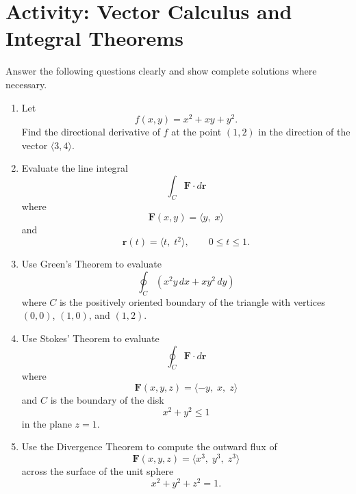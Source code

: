 \section*{Activity: Vector Calculus and Integral Theorems}

Answer the following questions clearly and show complete solutions where necessary.

\begin{enumerate}
    \item Let
    \[
    f(x,y)=x^2+xy+y^2.
    \]
    Find the directional derivative of $f$ at the point $(1,2)$ in the direction of the vector $\langle 3,4\rangle$.

    \item Evaluate the line integral
    \[
    \int_C \mathbf{F}\cdot d\mathbf{r}
    \]
    where
    \[
    \mathbf{F}(x,y)=\langle y,\; x\rangle
    \]
    and
    \[
    \mathbf{r}(t)=\langle t,\; t^2\rangle,\qquad 0\le t\le 1.
    \]

    \item Use Green's Theorem to evaluate
    \[
    \oint_C (x^2y\,dx+xy^2\,dy)
    \]
    where $C$ is the positively oriented boundary of the triangle with vertices $(0,0)$, $(1,0)$, and $(1,2)$.

    \item Use Stokes' Theorem to evaluate
    \[
    \oint_C \mathbf{F}\cdot d\mathbf{r}
    \]
    where
    \[
    \mathbf{F}(x,y,z)=\langle -y,\; x,\; z\rangle
    \]
    and $C$ is the boundary of the disk
    \[
    x^2+y^2\le 1
    \]
    in the plane $z=1$.

    \item Use the Divergence Theorem to compute the outward flux of
    \[
    \mathbf{F}(x,y,z)=\langle x^3,\; y^3,\; z^3\rangle
    \]
    across the surface of the unit sphere
    \[
    x^2+y^2+z^2=1.
    \]
\end{enumerate}